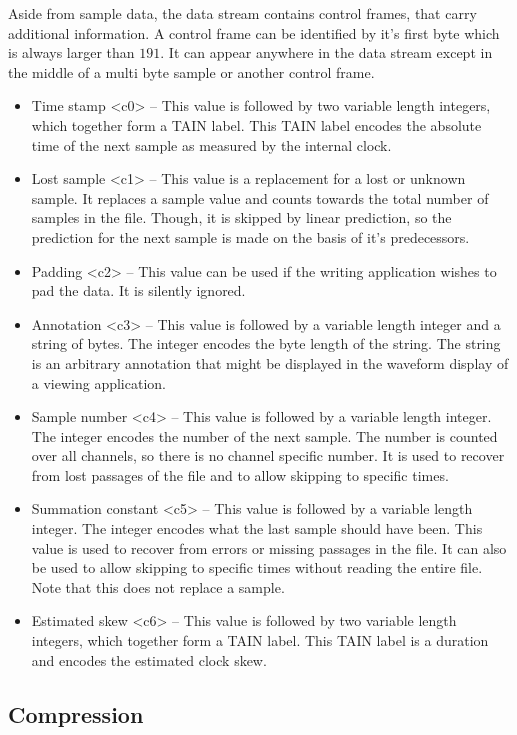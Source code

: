 \documentclass[DIV=10]{scrartcl}
\begin{document}
Aside from sample data, the data stream contains control frames, that carry additional information.
A control frame can be identified by it’s first byte which is always larger than \(191\).
It can appear anywhere in the data stream except in the middle of a multi byte sample or another control frame.

\begin{itemize}
  \item Time stamp <c0> – This value is followed by two variable length integers, which together form a TAIN label.
  This TAIN label encodes the absolute time of the next sample as measured by the internal clock.
  \item Lost sample <c1> – This value is a replacement for a lost or unknown sample.
  It replaces a sample value and counts towards the total number of samples in the file.
  Though, it is skipped by linear prediction, so the prediction for the next sample is made on the basis of it’s predecessors.
  \item Padding <c2> – This value can be used if the writing application wishes to pad the data.
  It is silently ignored.
  \item Annotation <c3> – This value is followed by a variable length integer and a string of bytes.
  The integer encodes the byte length of the string.
  The string is an arbitrary annotation that might be displayed in the waveform display of a viewing application.
  \item Sample number <c4> – This value is followed by a variable length integer.
  The integer encodes the number of the next sample.
  The number is counted over all channels, so there is no channel specific number.
  It is used to recover from lost passages of the file and to allow skipping to specific times.
  \item Summation constant <c5> – This value is followed by a variable length integer.
  The integer encodes what the last sample should have been.
  This value is used to recover from errors or missing passages in the file.
  It can also be used to allow skipping to specific times without reading the entire file.
  Note that this does not replace a sample.
  \item Estimated skew <c6> – This value is followed by two variable length integers, which together form a TAIN label.
  This TAIN label is a duration and encodes the estimated clock skew.
\end{itemize}

\subsection{Compression}
\label{compression}
\end{document}
